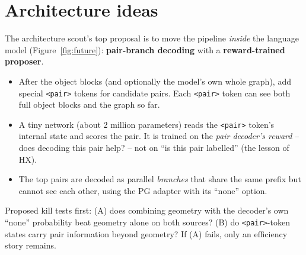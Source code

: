 \documentclass[11pt,openany]{book}
\begin{document}
\section{Architecture ideas}
The architecture scout's top proposal is to move the pipeline \emph{inside} the language model (Figure~\ref{fig:future}):
\textbf{pair-branch decoding} with a \textbf{reward-trained proposer}.
\begin{itemize}
  \item After the object blocks (and optionally the model's own whole graph), add special \texttt{<pair>} tokens for candidate pairs.
  Each \texttt{<pair>} token can see both full object blocks and the graph so far.
  \item A tiny network (about 2 million parameters) reads the \texttt{<pair>} token's internal state and scores the pair. It is
  trained on the \emph{pair decoder's reward} -- does decoding this pair help? -- not on ``is this pair labelled'' (the lesson of HX).
  \item The top pairs are decoded as parallel \emph{branches} that share the same prefix but cannot see each other, using the PG
  adapter with its ``none'' option.
\end{itemize}
Proposed kill tests first: (A) does combining geometry with the decoder's own ``none'' probability beat geometry alone on both
sources? (B) do \texttt{<pair>}-token states carry pair information beyond geometry? If (A) fails, only an efficiency story remains.
\end{document}
